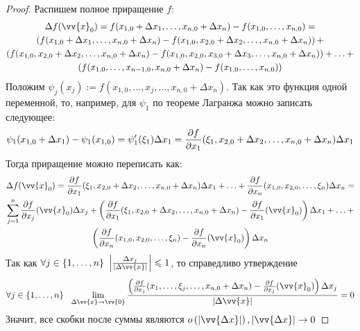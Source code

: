 \begin{proof}
	Распишем полное приращение $f$:
	\begin{multline*}
		\Delta f(\vv{x}_0) = f(x_{1, 0} + \Delta x_1, \ldots, x_{n, 0} + \Delta x_n) - f(x_{1, 0}, \ldots, x_{n, 0}) =
		\\
		\left(f(x_{1, 0} + \Delta x_1, \ldots, x_{n, 0} + \Delta x_n) - f(x_{1, 0}, x_{2, 0} + \Delta x_2, \ldots, x_{n, 0} + \Delta x_n)\right) +
		\\
		\left(f(x_{1, 0}, x_{2, 0} + \Delta x_2, \ldots, x_{n, 0} + \Delta x_n) - f(x_{1, 0}, x_{2, 0}, x_{3, 0} + \Delta x_3, \ldots, x_{n, 0} + \Delta x_n)\right) + \ldots +
		\\
		\left(f(x_{1, 0}, \ldots, x_{n - 1, 0}, x_{n, 0} + \Delta x_n) - f(x_{1, 0}, \ldots, x_{n, 0})\right)
	\end{multline*}
	Положим $\psi_j(x_j) := f(x_{1, 0}, \ldots, x_j, \ldots, x_{n, 0} + \Delta x_n)$. Так как это функция одной переменной, то, например, для $\psi_1$ по теореме Лагранжа можно записать следующее:
	\[
		\psi_1(x_{1, 0} + \Delta x_1) - \psi_1(x_{1, 0}) = \psi'_1(\xi_1)\Delta x_1 = \frac{\partial f}{\partial x_1}(\xi_1, x_{2, 0} + \Delta x_2, \ldots, x_{n, 0} + \Delta x_n)\Delta x_1
	\]
	Тогда приращение можно переписать как:
	\begin{multline*}
		\Delta f(\vv{x}_0) = \pd{f}{x_1}(\xi_1, x_{2, 0} + \Delta x_2, \ldots, x_{n, 0} + \Delta x_n)\Delta x_1 + \ldots + \pd{f}{x_n}(x_{1, 0}, x_{2, 0}, \ldots, \xi_n)\Delta x_n =
		\\
		\suml_{j = 1}^n \pd{f}{x_j} (\vv{x}_0) \Delta x_j + \left(\pd{f}{x_1} (\xi_1, x_{2, 0} + \Delta x_2, \ldots, x_{n, 0} + \Delta x_n) - \pd{f}{x_1}(\vv{x}_0)\right)\Delta x_1 + \ldots +
		\\
		\left(\pd{f}{x_n} (x_{1, 0}, x_{2, 0}, \ldots, \xi_n) - \pd{f}{x_n} (\vv{x}_0)\right)\Delta x_n
	\end{multline*}
	Так как $\forall j \in \range{n}\ \left|\frac{\Delta x_j}{|\Delta \vv{x}|}\right| \leq 1$, то справедливо утверждение
	\[
		\forall j \in \range{n}\ \ \liml_{\Delta\vv{x} \to \vv{0}}\frac{\left(\frac{\vdelta f}{\vdelta x_j}(x_1, \ldots, \xi_j, \ldots, x_{n, 0} + \Delta x_n) - \frac{\vdelta f}{\vdelta x_j}(\vv{x}_0)\right) \Delta x_j}{|\Delta \vv{x}|} = 0
	\]
	Значит, все скобки после суммы являются $o\left(|\vv{\Delta x}|\right), |\vv{\Delta x}| \to 0$
\end{proof}